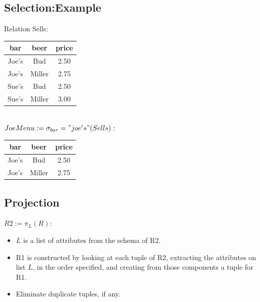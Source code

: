 \documentclass[a4paper]{article}
\begin{document}
        \subsection{Selection:Example}

            Relation Sells:
            \begin{center}
            \begin{tabular}{ |c|c|c| } 
            \hline
                bar & beer & price \\ 
            \hline
                Joe’s & Bud & 2.50 \\ 
                Joe’s & Miller & 2.75 \\ 
                Sue’s & Bud & 2.50 \\
                Sue’s & Miller & 3.00 \\
            \hline
            \end{tabular}
            \\ 
            $JoeMenu:= \sigma_{bar} = "joe's"(Sells):$ 
            \\ 
            
            \begin{tabular}{ |c|c|c| } 
            \hline
                bar & beer & price \\ 
            \hline
                Joe’s & Bud & 2.50 \\ 
                Joe’s & Miller & 2.75 \\ 
            \hline
            \end{tabular}   
            \end{center}



        \subsection{Projection}
            \begin{center}
            $R2:= \pi_{L}(R):$
            \end{center}
                \begin{itemize}
                    \item $L$ is a list of attributes from the schema of R2.
                    \item R1 is constructed by looking at each tuple of R2, extracting the attributes on list $L$, in the order specified, and creating from those components a tuple for R1.
                    \item Eliminate duplicate tuples, if any.
                \end{itemize}
\end{document}
